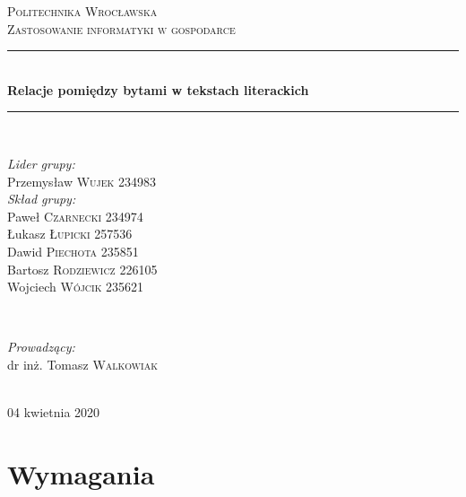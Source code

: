\documentclass[12pt,a4paper]{article} %
\begin{document}
\begin{titlepage}

\newcommand{\HRule}{\rule{\linewidth}{0.5mm}}

\center
 
\textsc{\LARGE Politechnika Wrocławska}\\[1.5cm] 
\textsc{\Large Zastosowanie informatyki w gospodarce}\\[0.5cm]

\HRule \\[0.5cm]
{ \huge \bfseries Relacje pomiędzy bytami w tekstach literackich}\\[0.2cm]
\HRule \\[1.6cm]
 
 
\begin{minipage}{0.4\textwidth}
\begin{flushleft} \large
\emph{Lider grupy:}\\
Przemysław \textsc{Wujek} 234983\\
\emph{Skład grupy:}\\
Paweł \textsc{Czarnecki} 234974\\
Łukasz \textsc{Łupicki} 257536\\
Dawid \textsc{Piechota} 235851\\
Bartosz \textsc{Rodziewicz} 226105\\
Wojciech \textsc{Wójcik} 235621\\
\end{flushleft}
\end{minipage}
~
\begin{minipage}{0.4\textwidth}
\begin{flushright} \large
\emph{Prowadzący:} \\
dr inż. Tomasz \textsc{Walkowiak} 
\end{flushright}
\end{minipage}\\[4cm]

\vfill
{\large 04 kwietnia 2020}

\end{titlepage}
   
\newpage

\section{Wymagania}
\end{document}
